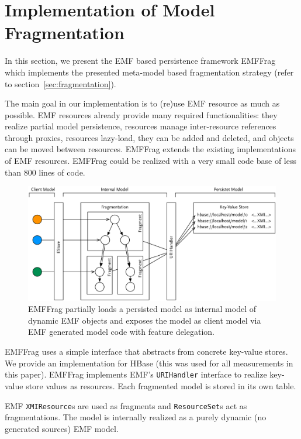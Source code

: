 \section{Implementation of Model Fragmentation}
\label{sec:implemention}

In this section, we present the EMF based persistence framework EMFFrag~\cite{EMFFragProject} which implements the presented meta-model based fragmentation strategy (refer to section~\ref{sec:fragmentation}).

The main goal in our implementation is to (re)use EMF resource as much as possible. EMF resources already provide many required functionalities: they realize partial model persistence, resources manage inter-resource references through proxies, resources lazy-load, they can be added and deleted, and objects can be moved between resources. EMFFrag extends the existing implementations of EMF resources. EMFFrag could be realized with a very small code base of less than 800 lines of code.

\begin{figure}[t]
  \centering
  \includegraphics[width=0.8\linewidth]{figures/simpleArchitecture}
  \caption{EMFFrag partially loads a persisted model as internal model of dynamic EMF objects and exposes the model as client model via EMF generated model code with feature delegation.}
  \label{fig:architecture}
\end{figure}

EMFFrag uses a simple interface that abstracts from concrete key-value stores. We provide an implementation for HBase (this was used for all measurements in this paper). EMFFrag implements EMF's \texttt{URIHandler} interface to realize key-value store values as resources. Each fragmented model is stored in its own table.

 EMF \texttt{XMIResource}s are used as fragments and \texttt{ResourceSet}s act as fragmentations. The model is internally realized as a purely dynamic (no generated sources) EMF model.

